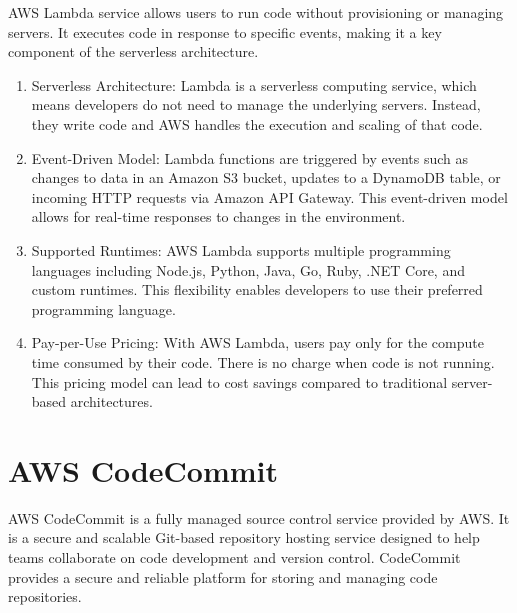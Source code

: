 \documentclass[11pt,a4paper,oneside]{report}
\begin{document}
AWS Lambda \cite{awslambda} service allows users to run code without provisioning or managing servers. It executes code in response to specific events, making it a key component of the serverless architecture.
\begin{enumerate}
  \item Serverless Architecture: Lambda is a serverless computing service, which means developers do not need to manage the underlying servers. Instead, they write code and AWS handles the execution and scaling of that code.
  \item Event-Driven Model: Lambda functions are triggered by events such as changes to data in an Amazon S3 bucket, updates to a DynamoDB table, or incoming HTTP requests via Amazon API Gateway. This event-driven model allows for real-time responses to changes in the environment.
  \item Supported Runtimes: AWS Lambda supports multiple programming languages including Node.js, Python, Java, Go, Ruby, .NET Core, and custom runtimes.
        This flexibility enables developers to use their preferred programming language.
  \item Pay-per-Use Pricing: With AWS Lambda, users pay only for the compute time consumed by their code. There is no charge when code is not running. This pricing model can lead to cost savings compared to traditional server-based architectures.
\end{enumerate}


\section{AWS CodeCommit}
AWS CodeCommit \cite{awscodecommit} is a fully managed source control service provided by AWS. It is a secure and scalable Git-based repository hosting service designed to help teams collaborate on code development and version control. CodeCommit provides a secure and reliable platform for storing and managing code repositories.
\end{document}
